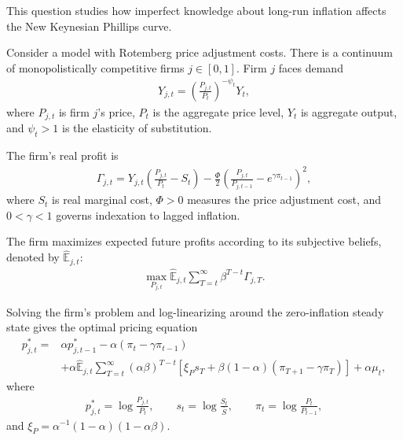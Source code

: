 \documentclass[12pt]{article}
\begin{document}
\begin{enumerate}[label=\arabic*.]
    This question studies how imperfect knowledge about long-run inflation affects the New Keynesian Phillips curve.
    
    Consider a model with Rotemberg price adjustment costs. There is a continuum of monopolistically competitive firms $j\in[0,1]$. Firm $j$ faces demand
    \begin{align*}
        Y_{j,t}
        =
        \left(\frac{P_{j,t}}{P_t}\right)^{-\psi_t}Y_t,
    \end{align*}
    where $P_{j,t}$ is firm $j$'s price, $P_t$ is the aggregate price level, $Y_t$ is aggregate output, and $\psi_t>1$ is the elasticity of substitution.
    
    The firm's real profit is
    \begin{align*}
        \Gamma_{j,t}
        =
        Y_{j,t}
        \left(
        \frac{P_{j,t}}{P_t}-S_t
        \right)
        -
        \frac{\Phi}{2}
        \left(
        \frac{P_{j,t}}{P_{j,t-1}}
        -
        e^{\gamma\pi_{t-1}}
        \right)^2,
    \end{align*}
    where $S_t$ is real marginal cost, $\Phi>0$ measures the price adjustment cost, and $0<\gamma<1$ governs indexation to lagged inflation.
    
    The firm maximizes expected future profits according to its subjective beliefs, denoted by $\hat{\mathbb{E}}_{j,t}$:
    \begin{align*}
        \max_{P_{j,t}}
        \hat{\mathbb{E}}_{j,t}
        \sum_{T=t}^{\infty}
        \beta^{T-t}\Gamma_{j,T}.
    \end{align*}
    
    Solving the firm's problem and log-linearizing around the zero-inflation steady state gives the optimal pricing equation
    \begin{align*}
    p^*_{j,t}
    =
    &\alpha p^*_{j,t-1}
    -\alpha(\pi_t-\gamma\pi_{t-1})  \\
    &+
    \alpha\hat{\mathbb{E}}_{j,t}
    \sum_{T=t}^{\infty}
    (\alpha\beta)^{T-t}
    \left[
    \xi_P s_T
    +
    \beta(1-\alpha)(\pi_{T+1}-\gamma\pi_T)
    \right]
    +
    \alpha\mu_t,
    \end{align*}
    where
    \begin{align*}
        p^*_{j,t}
        =
        \log\frac{P_{j,t}}{P_t},
        \qquad
        s_t
        =
        \log\frac{S_t}{\bar S},
        \qquad
        \pi_t
        =
        \log\frac{P_t}{P_{t-1}},
    \end{align*}
    and $\xi_P = \alpha^{-1}(1-\alpha)(1-\alpha\beta)$.
    

\end{enumerate}
\end{document}
